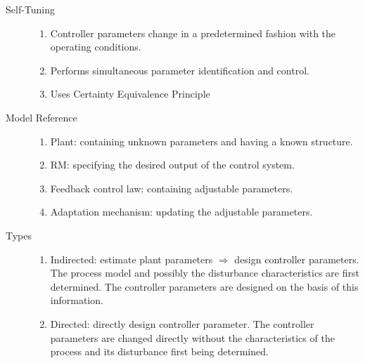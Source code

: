   \begin{description}
    \item[Self-Tuning]
    \begin{enumerate}
      \item Controller parameters change in a predetermined fashion with the
      operating conditions.
      
      \item Performs simultaneous parameter identification and control.
      
      \item Uses Certainty Equivalence Principle
    \end{enumerate}
  \end{description}
  
  \begin{description}
    \item[Model Reference]
    \begin{enumerate}
      \item Plant: containing unknown parameters and having a known structure.
      
      \item RM: specifying the desired output of the control system.
      
      \item Feedback control law: containing adjustable parameters.
      
      \item Adaptation mechanism: updating the adjustable parameters.
    \end{enumerate}
  \end{description}
  
  \begin{description}
    \item[Types]
    \begin{enumerate}
      \item Indirected: estimate plant parameters $\Rightarrow$ design
      controller parameters. The process model and possibly the disturbance
      characteristics are first determined. The controller parameters are
      designed on the basis of this information.
      
      \item Directed: directly design controller parameter. The controller
      parameters are changed directly without the characteristics of the process
      and its disturbance first being determined.
    \end{enumerate}
  \end{description}